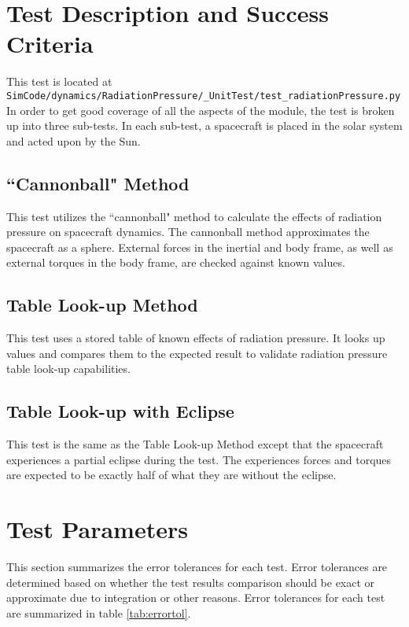 \section{Test Description and Success Criteria}
This test is located at {\tt SimCode/dynamics/RadiationPressure/\_UnitTest/test\_radiationPressure.py} In order to get good coverage of all the aspects of the module, the test is broken up into three sub-tests. In each sub-test, a spacecraft is placed in the solar system and acted upon by the Sun. \par

\subsection{``Cannonball" Method} This test utilizes the ``cannonball" method to calculate the effects of radiation pressure on spacecraft dynamics. The cannonball method approximates the spacecraft as a sphere. External forces in the inertial and body frame, as well as external torques in the body frame, are checked against known values.
\subsection{Table Look-up Method} This test uses a stored table of known effects of radiation pressure. It looks up values and compares them to the expected result to validate radiation pressure table look-up capabilities.
\subsection{Table Look-up with Eclipse} This test is the same as the Table Look-up Method except that the spacecraft experiences a partial eclipse during the test. The experiences forces and torques are expected to be exactly half of what they are without the eclipse.



\section{Test Parameters}

This section summarizes the error tolerances for each test. Error tolerances are determined based on whether the test results comparison should be exact or approximate due to integration or other reasons. Error tolerances for each test are summarized in table \ref{tab:errortol}. 

